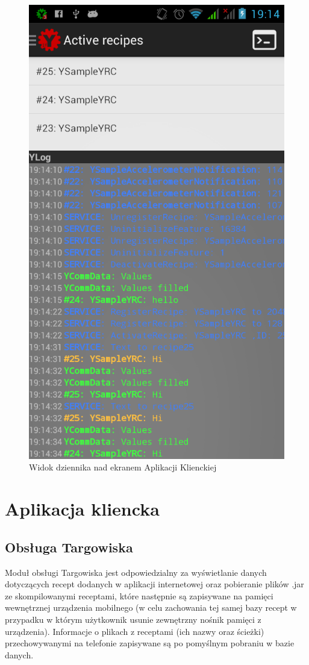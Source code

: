 \documentclass[11pt,a4paper,polish,thesis]{dcsbook}
\begin{document}
\begin{figure}[H]
  \centering
  \includegraphics[scale=0.3]{./resources/logs.png}
  \caption{Widok dziennika nad ekranem Aplikacji Klienckiej}
  \label{fig:logs}
\end{figure}

\section{Aplikacja kliencka}
\subsection {Obsługa Targowiska}
Moduł obsługi Targowiska jest odpowiedzialny za  wyświetlanie danych dotyczących recept dodanych w aplikacji internetowej oraz pobieranie plików .jar ze skompilowanymi receptami, które następnie są zapisywane na pamięci wewnętrznej urządzenia mobilnego (w celu zachowania tej samej bazy recept w przypadku w którym użytkownik usunie zewnętrzny nośnik pamięci z urządzenia). Informacje o plikach z receptami (ich nazwy oraz ścieżki) przechowywanymi na telefonie zapisywane są po pomyślnym pobraniu w  bazie danych.
\end{document}

